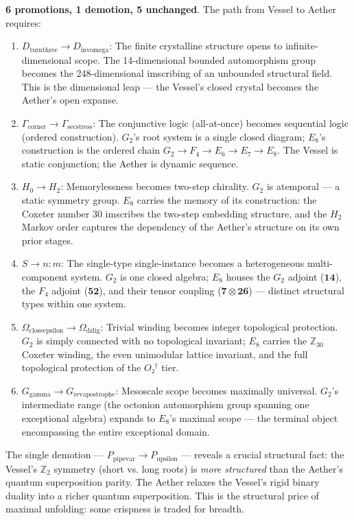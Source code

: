 \documentclass[12pt,a4paper]{article}
\begin{document}
\textbf{6 promotions, 1 demotion, 5 unchanged}. The path from Vessel to Aether requires:

\begin{enumerate}
    \item \textbf{$D_{\text{turnthree}} \to D_{\text{invomega}}$}: The finite crystalline structure opens to infinite-dimensional scope. The 14-dimensional bounded automorphism group becomes the 248-dimensional imscribing of an unbounded structural field. This is the dimensional leap --- the Vessel's closed crystal becomes the Aether's open expanse.
    \item \textbf{$\Gamma_{\text{corner}} \to \Gamma_{\text{secstress}}$}: The conjunctive logic (all-at-once) becomes sequential logic (ordered construction). $G_2$'s root system is a single closed diagram; $E_8$'s construction is the ordered chain $G_2 \to F_4 \to E_6 \to E_7 \to E_8$. The Vessel is static conjunction; the Aether is dynamic sequence.
    \item \textbf{$H_0 \to H_2$}: Memorylessness becomes two-step chirality. $G_2$ is atemporal --- a static symmetry group. $E_8$ carries the memory of its construction: the Coxeter number 30 imscribes the two-step embedding structure, and the $H_2$ Markov order captures the dependency of the Aether's structure on its own prior stages.
    \item \textbf{$S \to n{:}m$}: The single-type single-instance becomes a heterogeneous multi-component system. $G_2$ is one closed algebra; $E_8$ houses the $G_2$ adjoint ($\mathbf{14}$), the $F_4$ adjoint ($\mathbf{52}$), and their tensor coupling ($\mathbf{7} \otimes \mathbf{26}$) --- distinct structural types within one system.
    \item \textbf{$\Omega_{\text{closeepsilon}} \to \Omega_{\text{dzlig}}$}: Trivial winding becomes integer topological protection. $G_2$ is simply connected with no topological invariant; $E_8$ carries the $\mathbb{Z}_{30}$ Coxeter winding, the even unimodular lattice invariant, and the full topological protection of the $O₂^\dagger$ tier.
    \item \textbf{$G_{\text{gamma}} \to G_{\text{revapostrophe}}$}: Mesoscale scope becomes maximally universal. $G_2$'s intermediate range (the octonion automorphism group spanning one exceptional algebra) expands to $E_8$'s maximal scope --- the terminal object encompassing the entire exceptional domain.
\end{enumerate}

The single demotion --- $P_{\text{pipevar}} \to P_{\text{upsilon}}$ --- reveals a crucial structural fact: the Vessel's $\mathbb{Z}_2$ symmetry (short vs. long roots) is \emph{more structured} than the Aether's quantum superposition parity. The Aether relaxes the Vessel's rigid binary duality into a richer quantum superposition. This is the structural price of maximal unfolding: some crispness is traded for breadth.
\end{document}
